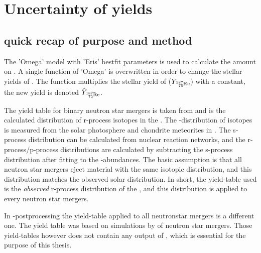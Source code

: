 \section{Uncertainty of yields}

\subsection{quick recap of purpose and method}
The 'Omega' model with 'Eris' bestfit parameters is used to calculate the amount on .
A single function of 'Omega' is overwritten in order to change the stellar yields of .
The function multiplies the stellar yield of  ($Y_\re{187}$) with a constant, the new yield is denoted $\hat{Y}_\re{187}$.

The yield table for binary neutron star mergers is taken from \cite{arnould07} and is the calculated distribution of r-process isotopes in the \sos. The \sos-distribution of isotopes is measured from the solar photosphere and chondrite meteorites in \cite{landolt93}. The s-process distribution can be calculated from nuclear reaction networks, and the r-process/p-process distributions are calculated by subtracting the s-process distribution after fitting to the \sos-abundances.
The basic assumption is that all neutron star mergers eject material with the same isotopic distribution, and this distribution matches the observed solar distribution.
In short, the yield-table used is the \textit{observed} r-process distribution of the \sos, and this distribution is applied to every neutron star mergers.

In \eris-postprocessing\cite{shen15} the yield-table applied to all neutronstar mergers is a different one.
The yield table was based on simulations by  of neutron star mergers. Those yield-tables however does not contain any output of , which is essential for the purpose of this thesis.


